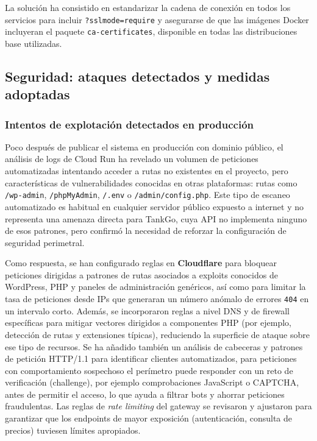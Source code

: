 La solución ha consistido en estandarizar la cadena de conexión en todos los servicios para
incluir \texttt{?sslmode=require} y asegurarse de que las imágenes Docker incluyeran el
paquete \texttt{ca-certificates}, disponible en todas las distribuciones base utilizadas.

\subsection{Seguridad: ataques detectados y medidas adoptadas}
\label{subsec:inc_seguridad}

\subsubsection*{Intentos de explotación detectados en producción}

Poco después de publicar el sistema en producción con dominio público, el análisis de logs
de Cloud Run ha revelado un volumen de peticiones automatizadas intentando acceder
a rutas no existentes en el proyecto, pero características de vulnerabilidades conocidas en
otras plataformas: rutas como \texttt{/wp-admin}, \texttt{/phpMyAdmin},
\texttt{/.env} o \texttt{/admin/config.php}. Este tipo de escaneo automatizado
es habitual en cualquier servidor público expuesto a internet y no representa una amenaza
directa para TankGo, cuya API no implementa ninguno de esos patrones, pero confirmó la
necesidad de reforzar la configuración de seguridad perimetral.

Como respuesta, se han configurado reglas en \textbf{Cloudflare} para bloquear peticiones
dirigidas a patrones de rutas asociados a exploits conocidos de WordPress, PHP y paneles
de administración genéricos, así como para limitar la tasa de peticiones desde IPs que
generaran un número anómalo de errores \texttt{404} en un intervalo corto. Además, se
incorporaron reglas a nivel DNS y de firewall específicas para mitigar vectores dirigidos
a componentes PHP (por ejemplo, detección de rutas y extensiones típicas), reduciendo la
superficie de ataque sobre ese tipo de recursos. Se ha añadido también un análisis de
cabeceras y patrones de petición HTTP/1.1 para identificar clientes automatizados, para
peticiones con comportamiento sospechoso el perímetro puede responder con un reto de
verificación (challenge), por ejemplo comprobaciones JavaScript o CAPTCHA, antes de
permitir el acceso, lo que ayuda a filtrar bots y ahorrar peticiones fraudulentas.
Las reglas de \textit{rate limiting} del gateway se revisaron y ajustaron para garantizar que los
endpoints de mayor exposición (autenticación, consulta de precios) tuviesen límites
apropiados.


